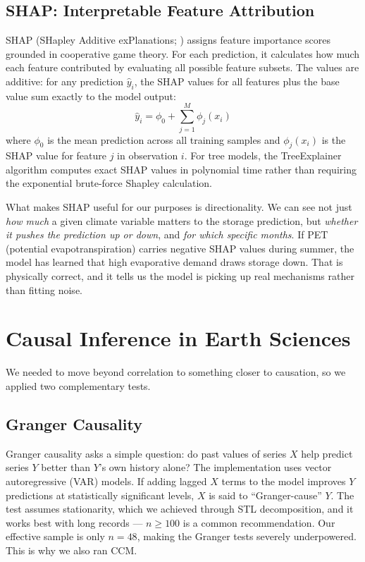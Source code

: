 \documentclass[12pt,a4paper,oneside]{report}
\begin{document}
\subsection{SHAP: Interpretable Feature Attribution}

SHAP (SHapley Additive exPlanations; \citealt{Lundberg2017}) assigns
feature importance scores grounded in cooperative game theory. For each
prediction, it calculates how much each feature contributed by evaluating
all possible feature subsets. The values are additive: for any prediction
$\hat{y}_i$, the SHAP values for all features plus the base value sum
exactly to the model output:
\begin{equation}
  \hat{y}_i = \phi_0 + \sum_{j=1}^{M} \phi_j(x_i)
  \label{eq:shap}
\end{equation}
where $\phi_0$ is the mean prediction across all training samples and
$\phi_j(x_i)$ is the SHAP value for feature $j$ in observation $i$. For
tree models, the TreeExplainer algorithm computes exact SHAP values in
polynomial time rather than requiring the exponential brute-force Shapley
calculation.

What makes SHAP useful for our purposes is directionality. We can see not
just \textit{how much} a given climate variable matters to the storage
prediction, but \textit{whether it pushes the prediction up or down}, and
\textit{for which specific months}. If PET (potential evapotranspiration)
carries negative SHAP values during summer, the model has learned that high
evaporative demand draws storage down. That is physically correct, and it
tells us the model is picking up real mechanisms rather than fitting noise.

\section{Causal Inference in Earth Sciences}

We needed to move beyond correlation to something closer to causation, so
we applied two complementary tests.

\subsection{Granger Causality}

Granger causality \citep{Granger1969} asks a simple question: do past
values of series $X$ help predict series $Y$ better than $Y$'s own history
alone? The implementation uses vector autoregressive (VAR) models. If
adding lagged $X$ terms to the model improves $Y$ predictions at
statistically significant levels, $X$ is said to ``Granger-cause'' $Y$.
The test assumes stationarity, which we achieved through STL decomposition,
and it works best with long records --- $n \geq 100$ is a common
recommendation. Our effective sample is only $n = 48$, making the Granger
tests severely underpowered. This is why we also ran CCM.
\end{document}
